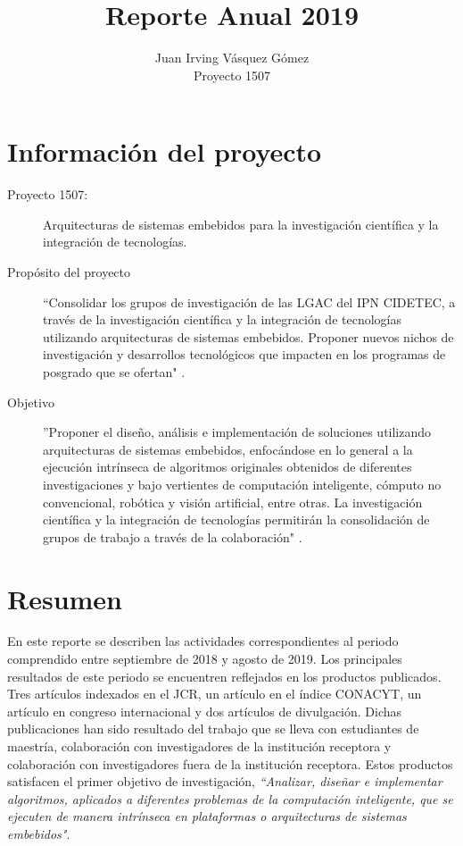 \documentclass[]{article}
\title{Reporte Anual 2019}
\author{Juan Irving Vásquez Gómez\\ Proyecto 1507}
\begin{document}
	
	\maketitle
	
	
	
	\section{Información del proyecto}
	
	\begin{description}
		\item[Proyecto 1507:] Arquitecturas de sistemas embebidos para la investigación científica y la integración de tecnologías.
		\item[Propósito del proyecto] ``Consolidar  los  grupos  de  investigación  de  las  LGAC  del  IPN  CIDETEC,  a  través  de  la  investigación científica y la integración de tecnologías utilizando arquitecturas de sistemas embebidos. Proponer nuevos  nichos  de  investigación  y  desarrollos  tecnológicos  que  impacten  en  los  programas  de posgrado que se ofertan" \cite{proyecto1507}. 
		\item[Objetivo] ''Proponer el diseño, análisis e implementación de soluciones utilizando arquitecturas de sistemas embebidos, enfocándose en lo general a la ejecución intrínseca de algoritmos originales obtenidos 
		de  diferentes  investigaciones  y  bajo  vertientes  de  computación  inteligente,  cómputo  no convencional, robótica y visión artificial, entre otras. La investigación científica y la integración de tecnologías permitirán la consolidación de grupos de trabajo a través de la colaboración" \cite{proyecto1507}.
	\end{description}
	
	
\section{Resumen}

En este reporte se describen las actividades correspondientes al periodo comprendido entre septiembre de 2018 y agosto de 2019. Los principales resultados de este periodo se encuentren reflejados en los productos publicados. Tres artículos indexados en el JCR, un artículo en el índice CONACYT, un artículo en congreso internacional y dos artículos de divulgación. Dichas publicaciones han sido resultado del trabajo que se lleva con estudiantes de maestría, colaboración con investigadores de la institución receptora y colaboración con investigadores fuera de la institución receptora. Estos productos satisfacen el primer objetivo de investigación, \textit{``Analizar, diseñar e implementar algoritmos, aplicados a diferentes problemas de la computación inteligente, que se ejecuten de manera intrínseca en plataformas o arquitecturas de sistemas embebidos"}\cite{anexo2actualizado}.
\end{document}
